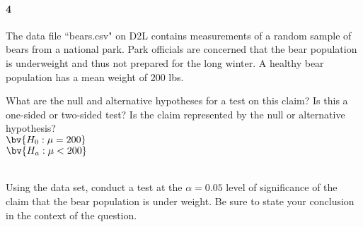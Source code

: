 \documentclass{article}
\begin{document}
\begin{flushleft}
\paragraph{4} The data file ``bears.csv" on D2L contains measurements of a random sample of bears from a national park. Park officials are concerned that the bear population is underweight and thus not prepared for the long winter. A healthy bear population has a mean weight of 200 lbs.
\begin{enumalpha}
\item What are the null and alternative hypotheses for a test on this claim? Is this a one-sided or two-sided test? Is the claim represented by the null or alternative hypothesis?\\
\medskip
$\bv{H_0: \mu = 200}$\\
$\bv{H_a: \mu < 200}$\\
\\
\vspace{.5in}
\item Using the data set, conduct a test at the $\alpha = 0.05$ level of significance of the claim that the bear population is under weight. Be sure to state your conclusion in the context of the question.\\
\medskip
{}

\end{enumalpha}



\end{flushleft}
\end{document}

